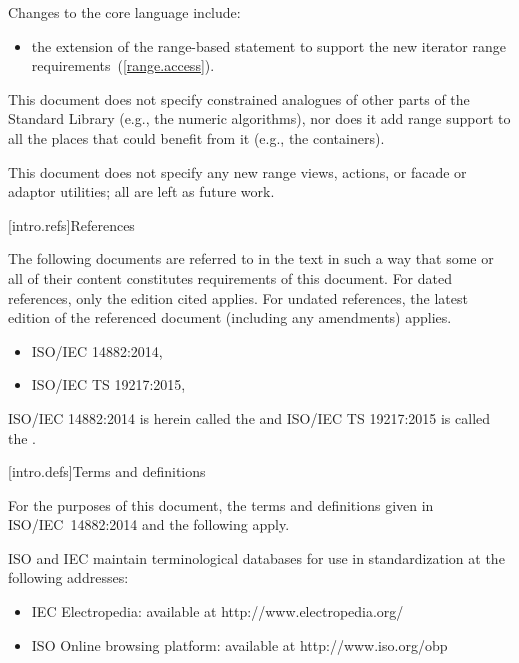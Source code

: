 \pnum
Changes to the core language include:

\begin{itemize}
\item the extension of the range-based  statement to support
the new iterator range requirements~(\ref{range.access}).
\end{itemize}

\pnum
This document does not specify constrained analogues of other parts of the Standard
Library (e.g., the numeric algorithms), nor does it add range support to all the
places that could benefit from it (e.g., the containers).

\pnum
This document does not specify any new range views, actions, or facade or adaptor
utilities; all are left as future work.

[intro.refs]{References}

\pnum
The following documents are referred to in the text in such a way that some or
all of their content constitutes requirements of this document. For dated
references, only the edition cited applies. For undated references, the latest
edition of the referenced document (including any amendments) applies.

\begin{itemize}
\item ISO/IEC 14882:2014, 
\item ISO/IEC TS 19217:2015, 
\end{itemize}

ISO/IEC 14882:2014 is herein called the \defn{C\Rplus\Rplus\xspace Standard} and
ISO/IEC TS 19217:2015 is called the .

[intro.defs]{Terms and definitions}

For the purposes of this document, the terms and definitions given in
ISO/IEC~14882:2014 and the following apply.

ISO and IEC maintain terminological databases for use in standardization at
the following addresses:
\begin{itemize}
\item
IEC Electropedia: available at http://www.electropedia.org/
\item
ISO Online browsing platform: available at http://www.iso.org/obp
\end{itemize}

\def\definition{\definitionx{\section}}%


